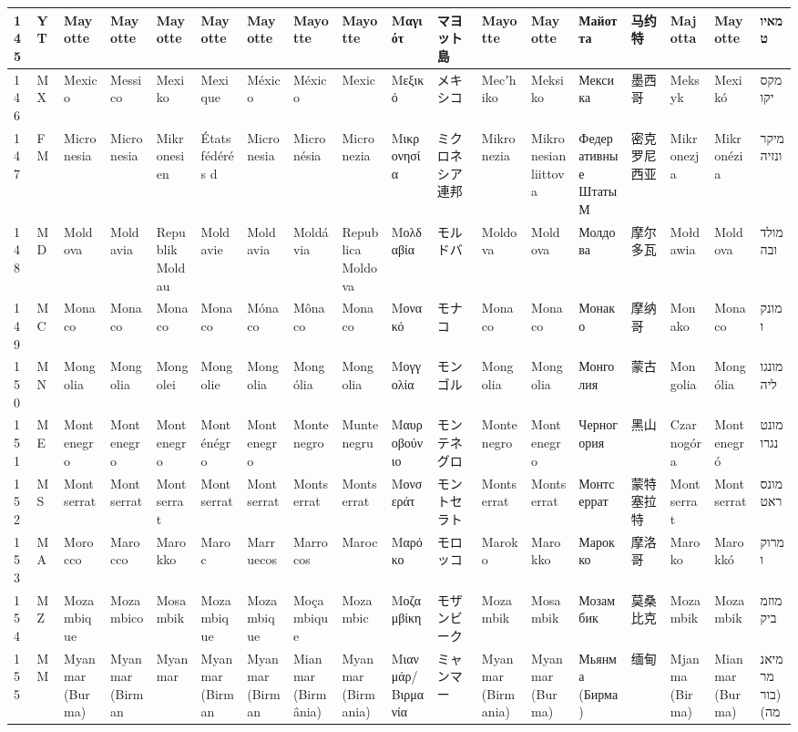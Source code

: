 \begin{longtable}{|l|l|l|l|l|l|l|l|l|l|l|l|l|l|l|l|l|l|}
145 & YT & Mayotte & Mayotte & Mayotte & Mayotte & Mayotte & Mayotte & Mayotte & Μαγιότ & マヨット島 & Mayotte & Mayotte & Майотта & 马约特 & Majotta & Mayotte & מאיוט \\ \hline 
146 & MX & Mexico & Messico & Mexiko & Mexique & México & México & Mexic & Μεξικό & メキシコ & Mecʼhiko & Meksiko & Мексика & 墨西哥 & Meksyk & Mexikó & מקסיקו \\ \hline 
147 & FM & Micronesia & Micronesia & Mikronesien & États fédérés d & Micronesia & Micronésia & Micronezia & Μικρονησία & ミクロネシア連邦 & Mikronezia & Mikronesian liittova & Федеративные Штаты М & 密克罗尼西亚 & Mikronezja & Mikronézia & מיקרונזיה \\ \hline 
148 & MD & Moldova & Moldavia & Republik Moldau & Moldavie & Moldavia & Moldávia & Republica Moldova & Μολδαβία & モルドバ & Moldova & Moldova & Молдова & 摩尔多瓦 & Mołdawia & Moldova & מולדובה \\ \hline 
149 & MC & Monaco & Monaco & Monaco & Monaco & Mónaco & Mônaco & Monaco & Μονακό & モナコ & Monaco & Monaco & Монако & 摩纳哥 & Monako & Monaco & מונקו \\ \hline 
150 & MN & Mongolia & Mongolia & Mongolei & Mongolie & Mongolia & Mongólia & Mongolia & Μογγολία & モンゴル & Mongolia & Mongolia & Монголия & 蒙古 & Mongolia & Mongólia & מונגוליה \\ \hline 
151 & ME & Montenegro & Montenegro & Montenegro & Monténégro & Montenegro & Montenegro & Muntenegru & Μαυροβούνιο & モンテネグロ & Montenegro & Montenegro & Черногория & 黑山 & Czarnogóra & Montenegró & מונטנגרו \\ \hline 
152 & MS & Montserrat & Montserrat & Montserrat & Montserrat & Montserrat & Montserrat & Montserrat & Μονσεράτ & モントセラト & Montserrat & Montserrat & Монтсеррат & 蒙特塞拉特 & Montserrat & Montserrat & מונסראט \\ \hline 
153 & MA & Morocco & Marocco & Marokko & Maroc & Marruecos & Marrocos & Maroc & Μαρόκο & モロッコ & Maroko & Marokko & Марокко & 摩洛哥 & Maroko & Marokkó & מרוקו \\ \hline 
154 & MZ & Mozambique & Mozambico & Mosambik & Mozambique & Mozambique & Moçambique & Mozambic & Μοζαμβίκη & モザンビーク & Mozambik & Mosambik & Мозамбик & 莫桑比克 & Mozambik & Mozambik & מוזמביק \\ \hline 
155 & MM & Myanmar (Burma) & Myanmar (Birman & Myanmar & Myanmar (Birman & Myanmar (Birman & Mianmar (Birmânia) & Myanmar (Birmania) & Μιανμάρ/Βιρμανία & ミャンマー & Myanmar (Birmania) & Myanmar (Burma) & Мьянма (Бирма) & 缅甸 & Mjanma (Birma) & Mianmar (Burma) & מיאנמר (בורמה) \\ \hline 

\end{longtable}
